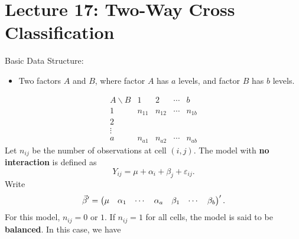 \section{Lecture 17: Two-Way Cross Classification}
Basic Data Structure:
\begin{itemize}
    \item Two factors $ A $ and $ B $, where
          factor $ A $ has $ a $ levels, and factor $ B $
          has $ b $ levels.
\end{itemize}
\[ \begin{array}{ccccc}
        A\backslash B & 1      & 2      & \cdots & b      \\
        1             & n_{11} & n_{12} & \cdots & n_{1b} \\
        2                                                 \\
        \vdots                                            \\
        a             & n_{a1} & n_{a2} & \cdots & n_{ab}
    \end{array} \]
Let $ n_{ij} $ be the number of observations at cell $ (i,j) $. The model with
\textbf{no interaction} is defined as
\[ Y_{ij}=\mu+\alpha_i+\beta_j+\varepsilon_{ij}. \]
Write
\[ \vec{\beta}'=\begin{pmatrix}
        \mu & \alpha_1 & \cdots & \alpha_a & \beta_1 & \cdots & \beta_b
    \end{pmatrix}'. \]
For this model, $ n_{ij}=0 $ or $ 1 $. If $ n_{ij}=1 $ for all cells, the model
is said to be \textbf{balanced}. In this case, we have
